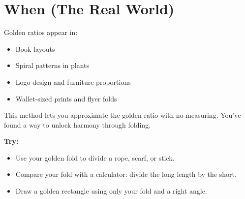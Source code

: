 \documentclass[11pt]{article}
\begin{document}
\section*{When (The Real World)}

Golden ratios appear in:
\begin{itemize}
    \item Book layouts
    \item Spiral patterns in plants
    \item Logo design and furniture proportions
    \item Wallet-sized prints and flyer folds
\end{itemize}

This method lets you approximate the golden ratio with no measuring. You’ve found a way to unlock harmony through folding.

\vspace{1em}
\textbf{Try:}
\begin{itemize}
    \item Use your golden fold to divide a rope, scarf, or stick.
    \item Compare your fold with a calculator: divide the long length by the short.
    \item Draw a golden rectangle using only your fold and a right angle.
\end{itemize}
\end{document}
